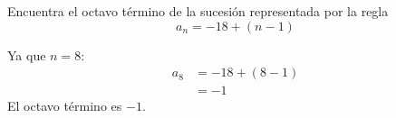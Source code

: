 Encuentra el octavo término de la sucesión representada por la regla 
\[a_n=-18+(n-1)\]

\begin{solutionbox}{4cm}
    Ya que $n=8$:
    \begin{align*}
        a_8&=-18+(8-1)\\
            &=-1
    \end{align*}   
    El octavo término es $-1$.
\end{solutionbox}

